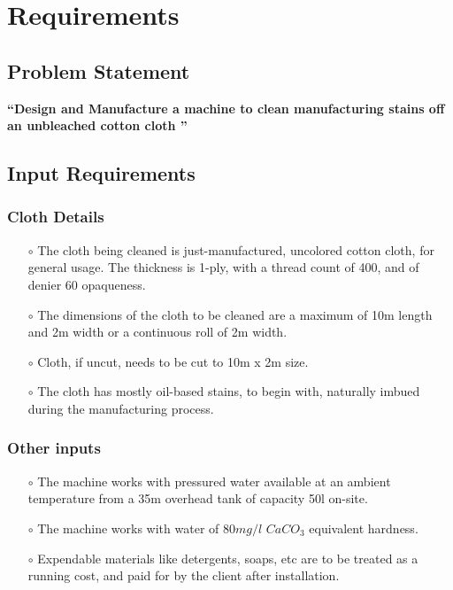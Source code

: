 \section{Requirements}
\subsection{Problem Statement}
\begin{center}
    \textbf{``Design and Manufacture a machine to clean manufacturing stains off an unbleached cotton cloth ''}
\end{center}

\subsection{Input Requirements}
\subsubsection{Cloth Details}
\begin{itemize}
    \item[$\scriptstyle\circ$] The cloth being cleaned is just-manufactured, uncolored cotton cloth, for general usage. The thickness is 1-ply, with a thread count of 400, and of denier 60 opaqueness.
    \item[$\scriptstyle\circ$] The dimensions of the cloth to be cleaned are a maximum of 10m length and 2m width or a continuous roll of 2m width.
    \item[$\scriptstyle\circ$] Cloth, if uncut, needs to be cut to 10m x 2m size.
    \item[$\scriptstyle\circ$] The cloth has mostly oil-based stains, to begin with, naturally imbued during the manufacturing process.
\end{itemize}
\subsubsection{Other inputs}
\begin{itemize}
    \item[$\scriptstyle\circ$] The machine works with pressured water available at an ambient temperature from a 35m overhead tank of capacity 50l on-site. 
    \item[$\scriptstyle\circ$] The machine works with water of $80mg/l$ $CaCO_3$ equivalent hardness.
    \item[$\scriptstyle\circ$] Expendable materials like detergents, soaps, etc are to be treated as a running cost, and paid for by the client after installation.
\end{itemize}
